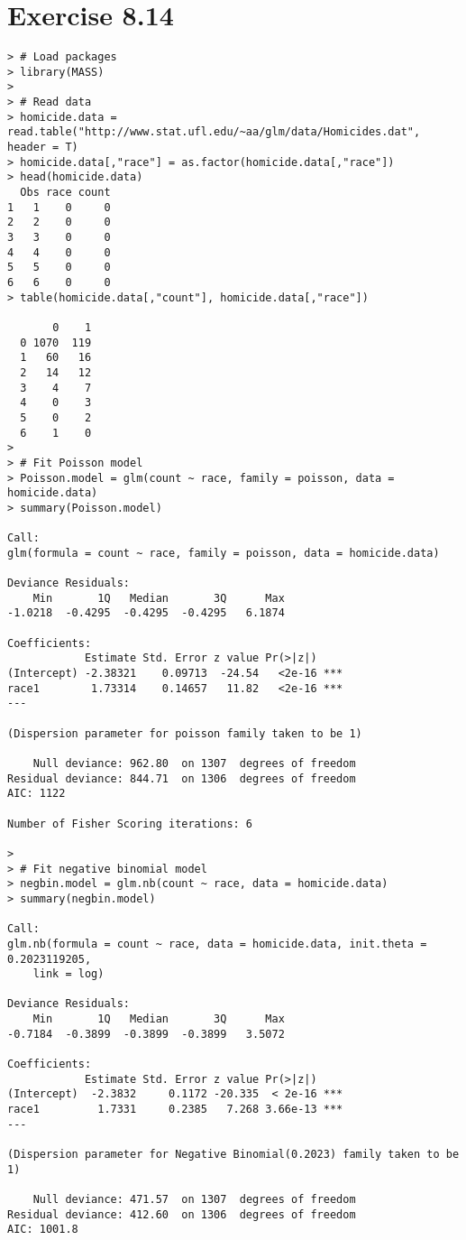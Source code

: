 \section*{Exercise 8.14}
\begin{lstlisting}
> # Load packages
> library(MASS)
> 
> # Read data
> homicide.data = read.table("http://www.stat.ufl.edu/~aa/glm/data/Homicides.dat", header = T)
> homicide.data[,"race"] = as.factor(homicide.data[,"race"])
> head(homicide.data)
  Obs race count
1   1    0     0
2   2    0     0
3   3    0     0
4   4    0     0
5   5    0     0
6   6    0     0
> table(homicide.data[,"count"], homicide.data[,"race"])
   
       0    1
  0 1070  119
  1   60   16
  2   14   12
  3    4    7
  4    0    3
  5    0    2
  6    1    0
> 
> # Fit Poisson model
> Poisson.model = glm(count ~ race, family = poisson, data = homicide.data)
> summary(Poisson.model)

Call:
glm(formula = count ~ race, family = poisson, data = homicide.data)

Deviance Residuals: 
    Min       1Q   Median       3Q      Max  
-1.0218  -0.4295  -0.4295  -0.4295   6.1874  

Coefficients:
            Estimate Std. Error z value Pr(>|z|)    
(Intercept) -2.38321    0.09713  -24.54   <2e-16 ***
race1        1.73314    0.14657   11.82   <2e-16 ***
---

(Dispersion parameter for poisson family taken to be 1)

    Null deviance: 962.80  on 1307  degrees of freedom
Residual deviance: 844.71  on 1306  degrees of freedom
AIC: 1122

Number of Fisher Scoring iterations: 6

> 
> # Fit negative binomial model
> negbin.model = glm.nb(count ~ race, data = homicide.data)
> summary(negbin.model)

Call:
glm.nb(formula = count ~ race, data = homicide.data, init.theta = 0.2023119205, 
    link = log)

Deviance Residuals: 
    Min       1Q   Median       3Q      Max  
-0.7184  -0.3899  -0.3899  -0.3899   3.5072  

Coefficients:
            Estimate Std. Error z value Pr(>|z|)    
(Intercept)  -2.3832     0.1172 -20.335  < 2e-16 ***
race1         1.7331     0.2385   7.268 3.66e-13 ***
---

(Dispersion parameter for Negative Binomial(0.2023) family taken to be 1)

    Null deviance: 471.57  on 1307  degrees of freedom
Residual deviance: 412.60  on 1306  degrees of freedom
AIC: 1001.8


\end{lstlisting}
